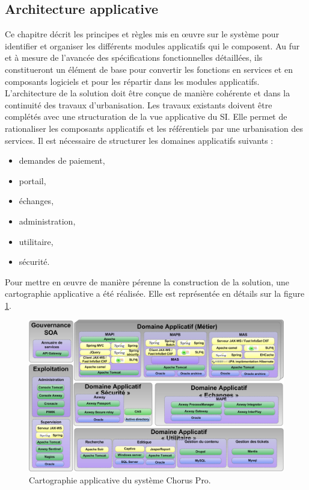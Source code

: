 \documentclass[12pt,a4paper]{article}
\begin{document}
\subsection{Architecture applicative}
Ce chapitre décrit les principes et règles mis en œuvre sur le système pour identifier et organiser les différents modules applicatifs qui le composent. Au fur et à mesure de l’avancée des spécifications fonctionnelles détaillées, ils constitueront un élément de base pour convertir les fonctions en services et en composants logiciels et pour les répartir dans les modules applicatifs. L’architecture de la solution doit être conçue de manière cohérente et dans la continuité des travaux d’urbanisation. Les travaux existants doivent être complétés avec une structuration de la vue applicative du \gls{SI}. Elle permet de rationaliser les composants applicatifs et les référentiels par une urbanisation des services.
\newpage
Il est nécessaire de structurer les domaines applicatifs suivants :
\smallbreak
\begin{itemize}
\item	demandes de paiement,
\item	portail,
\item	échanges,
\item	administration,
\item	utilitaire,
\item	sécurité.
\end{itemize}
\bigbreak
Pour mettre en œuvre de manière pérenne la construction de la solution, une  cartographie applicative a été réalisée. Elle est représentée en détails sur la figure \ref{vueApplicative}.
\medbreak
\begin{figure}[H]
	\begin{center}
		\includegraphics[width=\textwidth, height=\textheight, keepaspectratio]{cartographieApplicative.png}
		\caption{Cartographie applicative du système Chorus Pro.}
		\label{vueApplicative}
	\end{center}
\end{figure}
\end{document}
